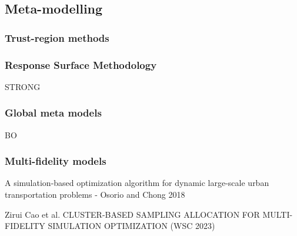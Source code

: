 \documentclass{article}
\begin{document}
\subsection{Meta-modelling}

\subsubsection{Trust-region methods}

\subsubsection{Response Surface Methodology}

STRONG

\subsubsection{Global meta models}

BO

\subsubsection{Multi-fidelity models}

A simulation-based optimization algorithm for dynamic large-scale urban transportation problems - Osorio and Chong 2018 \newline

Zirui Cao et al. CLUSTER-BASED SAMPLING ALLOCATION FOR MULTI-FIDELITY SIMULATION OPTIMIZATION (WSC 2023)
\end{document}
